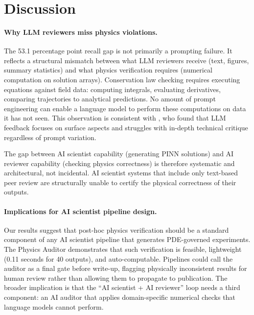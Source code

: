 \documentclass{article}
\begin{document}
\section{Discussion}

\paragraph{Why LLM reviewers miss physics violations.}
The 53.1 percentage point recall gap is not primarily a prompting failure.
It reflects a structural mismatch between what LLM reviewers receive (text,
figures, summary statistics) and what physics verification requires (numerical
computation on solution arrays).
Conservation law checking requires executing equations against field data:
computing integrals, evaluating derivatives, comparing trajectories to
analytical predictions.
No amount of prompt engineering can enable a language model to perform these
computations on data it has not seen.
This observation is consistent with \citet{Liang2024LLMReview}, who found
that LLM feedback focuses on surface aspects and struggles with
in-depth technical critique regardless of prompt variation.

The gap between AI scientist capability (generating PINN solutions) and AI
reviewer capability (checking physics correctness) is therefore systematic
and architectural, not incidental.
AI scientist systems that include only text-based peer review are structurally
unable to certify the physical correctness of their outputs.

\paragraph{Implications for AI scientist pipeline design.}
Our results suggest that post-hoc physics verification should be a standard
component of any AI scientist pipeline that generates PDE-governed experiments.
The Physics Auditor demonstrates that such verification is feasible,
lightweight (0.11 seconds for 40 outputs), and auto-computable.
Pipelines could call the auditor as a final gate before write-up, flagging
physically inconsistent results for human review rather than allowing them to
propagate to publication.
The broader implication is that the ``AI scientist + AI reviewer'' loop needs
a third component: an AI auditor that applies domain-specific numerical checks
that language models cannot perform.
\end{document}
